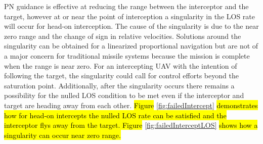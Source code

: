 \documentclass[conference]{IEEEtran}
\begin{document}



PN guidance is effective at reducing the range between the interceptor and the target, however at or near the point of interception a singularity in the LOS rate will occur for head-on interception. The cause of the singularity is due to the near zero range and the change of sign in relative velocities. Solutions around the singularity can be obtained for a linearized proportional navigation \cite{singularitySolution} but are not of a major concern for traditional missile systems because the mission is complete when the range is near zero. For an intercepting UAV with the intention of following the target, the singularity could call for control efforts beyond the saturation point. Additionally, after the singularity occurs there remains a possibility for the nulled LOS condition to be met even if the interceptor and target are heading away from each other. \hl{Figure} \ref{fig:failedIntercept} \hl{demonstrates how for head-on intercepts the nulled LOS rate can be satisfied and the interceptor flys away from the target. Figure} \ref{fig:failedInterceptLOS} \hl{shows how a singularity can occur near zero range.}
\end{document}

